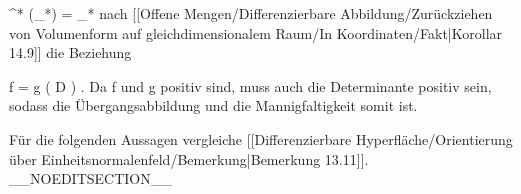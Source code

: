 {\mavergleichskette
{\vergleichskette
{ \psi^* (\beta_*\omega)
}
{ = }{ \alpha_* \omega
}
{  }{
}
{    }{
}
{   }{
}
}
{}{}{}
nach [[Offene Mengen/Differenzierbare Abbildung/Zurückziehen von Volumenform auf gleichdimensionalem Raum/In Koordinaten/Fakt|Korollar 14.9]]
die Beziehung

\mavergleichskette
{\vergleichskette
{ f
}
{ = }{ g \circ \psi \det  \left(  D  \psi  \right)
}
{  }{
}
{    }{
}
{   }{
}
}
{}{}{.}
Da
\mathkor {} {f} {und} {g} {}
positiv sind, muss auch die Determinante positiv sein, sodass die Übergangsabbildung
und die Mannigfaltigkeit somit
ist.

}


Für die folgenden Aussagen vergleiche
[[Differenzierbare Hyperfläche/Orientierung über Einheitsnormalenfeld/Bemerkung|Bemerkung 13.11]].
__NOEDITSECTION__

